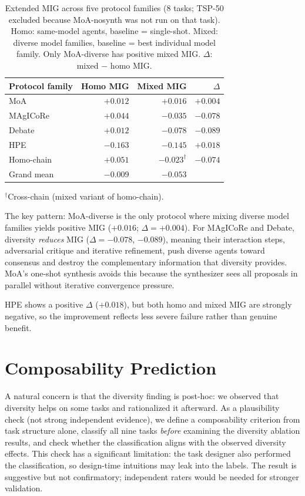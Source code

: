 \documentclass{article}
\begin{document}
\begin{table}[h]
\caption{Extended MIG across five protocol families (8 tasks; TSP-50 excluded because MoA-nosynth was not run on that task). Homo: same-model agents, baseline = single-shot. Mixed: diverse model families, baseline = best individual model family. Only MoA-diverse has positive mixed MIG. $\Delta$: mixed $-$ homo MIG.}
\label{tab:mig}
\centering
\small
\begin{tabular}{l r r r}
\toprule
Protocol family & Homo MIG & Mixed MIG & $\Delta$ \\
\midrule
MoA           & $+0.012$ & $\mathbf{+0.016}$ & $+0.004$ \\
MAgICoRe      & $+0.044$ & $-0.035$ & $-0.078$ \\
Debate        & $+0.012$ & $-0.078$ & $-0.089$ \\
HPE           & $-0.163$ & $-0.145$ & $+0.018$ \\
Homo-chain    & $+0.051$ & $-0.023^\dagger$ & $-0.074$ \\
\midrule
Grand mean    & $-0.009$ & $-0.053$ & \\
\bottomrule
\end{tabular}

\smallskip\noindent\small $^\dagger$Cross-chain (mixed variant of homo-chain).
\end{table}

The key pattern: MoA-diverse is the only protocol where mixing diverse model families yields positive MIG ($+0.016$; $\Delta{=}+0.004$). For MAgICoRe and Debate, diversity \emph{reduces} MIG ($\Delta{=}-0.078$, $-0.089$), meaning their interaction steps, adversarial critique and iterative refinement, push diverse agents toward consensus and destroy the complementary information that diversity provides. MoA's one-shot synthesis avoids this because the synthesizer sees all proposals in parallel without iterative convergence pressure.

HPE shows a positive $\Delta$ ($+0.018$), but both homo and mixed MIG are strongly negative, so the improvement reflects less severe failure rather than genuine benefit.

\section{Composability Prediction}
\label{app:composability}

A natural concern is that the diversity finding is post-hoc: we observed that diversity helps on some tasks and rationalized it afterward. As a plausibility check (not strong independent evidence), we define a composability criterion from task structure alone, classify all nine tasks \emph{before} examining the diversity ablation results, and check whether the classification aligns with the observed diversity effects. This check has a significant limitation: the task designer also performed the classification, so design-time intuitions may leak into the labels. The result is suggestive but not confirmatory; independent raters would be needed for stronger validation.
\end{document}
